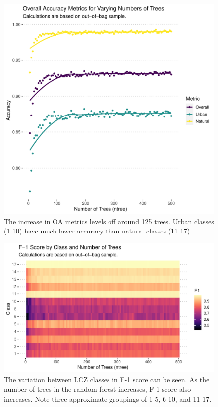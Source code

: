 \documentclass[
]{article}
\begin{document}
\begin{figure}
\centering
\includegraphics{../results/plots/varied_ntree_oas.pdf}
\caption{The increase in OA metrics levels off around 125 trees. Urban
classes (1-10) have much lower accuracy than natural classes (11-17).}
\end{figure}

\begin{figure}
\centering
\includegraphics{../results/plots/varied_ntree_f1_alternative.pdf}
\caption{The variation between LCZ classes in F-1 score can be seen. As
the number of trees in the random forest increases, F-1 score also
increases. Note three approximate groupings of 1-5, 6-10, and 11-17.}
\end{figure}
\end{document}
